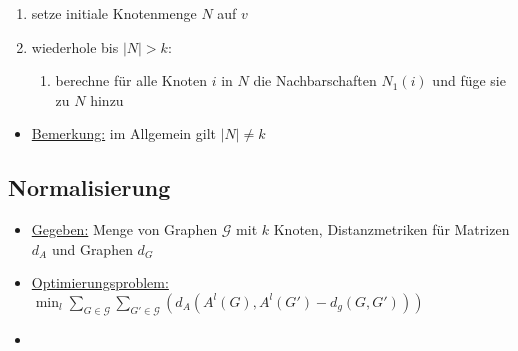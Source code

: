 \begin{enumerate}
  \item setze initiale Knotenmenge $N$ auf $v$
  \item wiederhole bis $|N| > k$:
    \begin{enumerate}
      \item berechne für alle Knoten $i$ in $N$ die Nachbarschaften $N_1(i)$ und füge sie zu $N$ hinzu
    \end{enumerate}
\end{enumerate}

\begin{itemize}
  \item \underline{Bemerkung:} im Allgemein gilt $|N| \neq k$
\end{itemize}

\subsection{Normalisierung}

\begin{itemize}
  \item \underline{Gegeben:} Menge von Graphen $\mathcal{G}$ mit $k$ Knoten, Distanzmetriken für Matrizen $d_A$ und Graphen $d_G$
  \item \underline{Optimierungsproblem:} $\min_l \sum_{G \in \mathcal{G}} \sum_{G' \in \mathcal{G}} {( d_A(A^l(G), A^l(G') - d_g(G, G')) )}$
  \item {}
\end{itemize}
